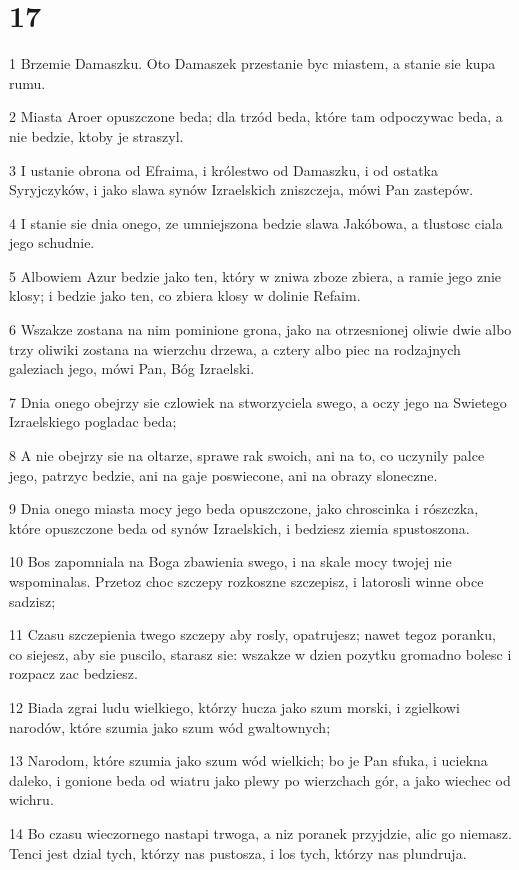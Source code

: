 \chapter{17}

\par 1 Brzemie Damaszku. Oto Damaszek przestanie byc miastem, a stanie sie kupa rumu.
\par 2 Miasta Aroer opuszczone beda; dla trzód beda, które tam odpoczywac beda, a nie bedzie, ktoby je straszyl.
\par 3 I ustanie obrona od Efraima, i królestwo od Damaszku, i od ostatka Syryjczyków, i jako slawa synów Izraelskich zniszczeja, mówi Pan zastepów.
\par 4 I stanie sie dnia onego, ze umniejszona bedzie slawa Jakóbowa, a tlustosc ciala jego schudnie.
\par 5 Albowiem Azur bedzie jako ten, który w zniwa zboze zbiera, a ramie jego znie klosy; i bedzie jako ten, co zbiera klosy w dolinie Refaim.
\par 6 Wszakze zostana na nim pominione grona, jako na otrzesnionej oliwie dwie albo trzy oliwiki zostana na wierzchu drzewa, a cztery albo piec na rodzajnych galeziach jego, mówi Pan, Bóg Izraelski.
\par 7 Dnia onego obejrzy sie czlowiek na stworzyciela swego, a oczy jego na Swietego Izraelskiego pogladac beda;
\par 8 A nie obejrzy sie na oltarze, sprawe rak swoich, ani na to, co uczynily palce jego, patrzyc bedzie, ani na gaje poswiecone, ani na obrazy sloneczne.
\par 9 Dnia onego miasta mocy jego beda opuszczone, jako chroscinka i rószczka, które opuszczone beda od synów Izraelskich, i bedziesz ziemia spustoszona.
\par 10 Bos zapomniala na Boga zbawienia swego, i na skale mocy twojej nie wspominalas. Przetoz choc szczepy rozkoszne szczepisz, i latorosli winne obce sadzisz;
\par 11 Czasu szczepienia twego szczepy aby rosly, opatrujesz; nawet tegoz poranku, co siejesz, aby sie puscilo, starasz sie: wszakze w dzien pozytku gromadno bolesc i rozpacz zac bedziesz.
\par 12 Biada zgrai ludu wielkiego, którzy hucza jako szum morski, i zgielkowi narodów, które szumia jako szum wód gwaltownych;
\par 13 Narodom, które szumia jako szum wód wielkich; bo je Pan sfuka, i uciekna daleko, i gonione beda od wiatru jako plewy po wierzchach gór, a jako wiechec od wichru.
\par 14 Bo czasu wieczornego nastapi trwoga, a niz poranek przyjdzie, alic go niemasz. Tenci jest dzial tych, którzy nas pustosza, i los tych, którzy nas plundruja.

